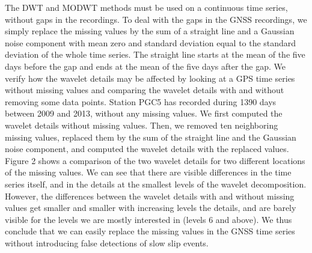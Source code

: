 \documentclass[draft]{agujournal2018}
\begin{document}
The DWT and MODWT methods must be used on a continuous time series, without gaps in the recordings. To deal with the gaps in the GNSS recordings, we simply replace the missing values by the sum of a straight line and a Gaussian noise component with mean zero and standard deviation equal to the standard deviation of the whole time series. The straight line starts at the mean of the five days before the gap and ends at the mean of the five days after the gap. We verify how the wavelet details may be affected by looking at a GPS time series without missing values and comparing the wavelet details with and without removing some data points. Station PGC5 has recorded during 1390 days between 2009 and 2013, without any missing values. We first computed the wavelet details without missing values. Then, we removed ten neighboring missing values, replaced them by the sum of the straight line and the Gaussian noise component, and computed the wavelet details with the replaced values. Figure 2 shows a comparison of the two wavelet details for two different locations of the missing values. We can see that there are visible differences in the time series itself, and in the details at the smallest levels of the wavelet decomposition. However, the differences between the wavelet details with and without missing values get smaller and smaller with increasing levels the details, and are barely visible for the levels we are mostly interested in (levels 6 and above). We thus conclude that we can easily replace the missing values in the GNSS time series without introducing false detections of slow slip events. \\
\end{document}
